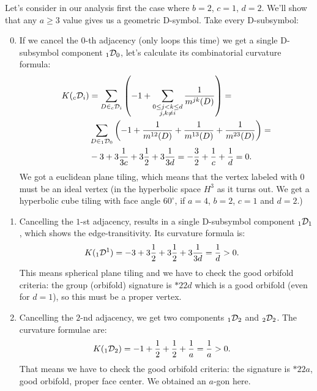 \documentclass[12pt,a4paper]{article}
\numberwithin{equation}{section}
\newcommand{\leftsub}[2]{{\vphantom{#2}}_{#1}{#2}}
\theoremstyle{plain}%
\theoremstyle{definition}
\theoremstyle{remark}
\begin{document}
Let's consider in our analysis first the case where $b=2$, $c=1$, $d=2$. We'll show that any $a\geq3$ value
gives us a geometric D-symbol. Take every D-subsymbol:
\begin{enumerate}
  \setcounter{enumi}{-1}
  \item If we cancel the $0$-th adjacency (only loops this time) we get a single D-subsymbol component
    $\leftsub{1}{\mathcal{D}}_0$, let's calculate its combinatorial curvature
    formula:
    \begin{align*}
      K(\leftsub{c}{\mathcal{D}}_i)&=\sum_{D\in
      \leftsub{c}{\mathcal{D}}_i}\left(-1+\sum_{\substack{0\le j<k\le d \\ j,k\ne i}}\frac{1}{m^{jk}(D)}\right)= \\
      &
      \sum_{D\in\leftsub{1}{\mathcal{D}}_0}\left(-1+\frac{1}{m^{12}(D)}+\frac{1}{m^{13}(D)}+\frac{1}{m^{23}(D)}\right)= \\
      & -3 + 3\frac{1}{3c} + 3\frac{1}{2} + 3\frac{1}{3d} =
      -\frac{3}{2}+\frac{1}{c}+\frac{1}{d} = 0.
    \end{align*}
    We got a euclidean plane tiling, which means that the vertex labeled with $0$ must
    be an ideal vertex (in the hyperbolic space $H^3$ as it turns out. We get a
    hyperbolic cube tiling with face angle $60^{\circ}$, if $a=4$, $b=2$, $c=1$ and
    $d=2$.)
  \item Cancelling the $1$-st adjacency, results in a single D-subsymbol
    component $\leftsub{1}{\mathcal{D}}_1$, which
    shows the edge-transitivity. Its curvature formula is:
    \begin{align*}
      K(\leftsub{1}{\mathcal{D}^1})&= -3 + 3\frac{1}{2} + 3\frac{1}{2} +
      3\frac{1}{3d} = \frac{1}{d} > 0.
    \end{align*}
    This means spherical plane tiling and we have to check the good orbifold
    criteria: the group (orbifold) signature is
    $*22d$ which is a good orbifold (even for $d=1$), so this must be a proper vertex.
  \item Cancelling the $2$-nd adjacency, we get two components
    $\leftsub{1}{\mathcal{D}}_2$ and $\leftsub{2}{\mathcal{D}}_2$. The curvature formulae are:
    \begin{align*}
      K(\leftsub{1}{\mathcal{D}}_2)&= -1 + \frac{1}{2} + \frac{1}{2} +
      \frac{1}{a} = \frac{1}{a} > 0.
    \end{align*}
    That means we have to check the good orbifold criteria: the signature is
    $*22a$, good orbifold, proper face center. We obtained an $a$-gon here.

\end{enumerate}
\end{document}
